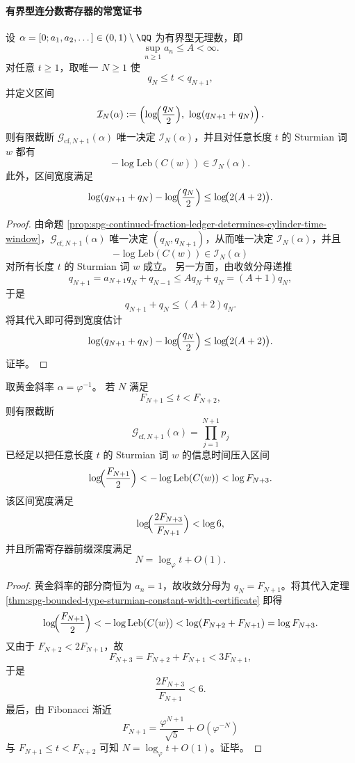 
\paragraph{有界型连分数寄存器的常宽证书}
\begin{theorem}\label{thm:spg-bounded-type-sturmian-constant-width-certificate}
设 \(\alpha=[0;a_1,a_2,\dots]\in(0,1)\setminus\QQ\) 为有界型无理数，即
\[
\sup_{n\ge 1}a_n\le A<\infty.
\]
对任意 \(t\ge 1\)，取唯一 \(N\ge 1\) 使
\[
q_N\le t<q_{N+1},
\]
并定义区间
\[
\mathcal I_N(\alpha)
:=
\left(
\log\!\Bigl(\frac{q_N}{2}\Bigr),\ 
\log(q_{N+1}+q_N)
\right).
\]
则有限截断 \(\mathcal G_{\mathrm{cf},N+1}(\alpha)\) 唯一决定 \(\mathcal I_N(\alpha)\)，并且对任意长度 \(t\) 的 Sturmian 词 \(w\) 都有
\[
-\log \mathrm{Leb}(C(w))\in \mathcal I_N(\alpha).
\]
此外，区间宽度满足
\[
\log(q_{N+1}+q_N)-\log\!\Bigl(\frac{q_N}{2}\Bigr)
\le
\log\!\bigl(2(A+2)\bigr).
\]
\end{theorem}
\begin{proof}
由命题 \ref{prop:spg-continued-fraction-ledger-determines-cylinder-time-window}，\(\mathcal G_{\mathrm{cf},N+1}(\alpha)\) 唯一决定 \((q_N,q_{N+1})\)，从而唯一决定 \(\mathcal I_N(\alpha)\)，并且
\[
-\log \mathrm{Leb}(C(w))\in \mathcal I_N(\alpha)
\]
对所有长度 \(t\) 的 Sturmian 词 \(w\) 成立。
另一方面，由收敛分母递推
\[
q_{N+1}=a_{N+1}q_N+q_{N-1}\le Aq_N+q_N=(A+1)q_N,
\]
于是
\[
q_{N+1}+q_N\le (A+2)q_N.
\]
将其代入即可得到宽度估计
\[
\log(q_{N+1}+q_N)-\log\!\Bigl(\frac{q_N}{2}\Bigr)
\le
\log\!\bigl(2(A+2)\bigr).
\]
证毕。
\end{proof}

\begin{corollary}[黄金斜率下的对数深度算术认证]\label{cor:spg-golden-sturmian-logarithmic-arithmetic-certificate}
取黄金斜率 \(\alpha=\varphi^{-1}\)。
若 \(N\) 满足
\[
F_{N+1}\le t<F_{N+2},
\]
则有限截断
\[
\mathcal G_{\mathrm{cf},N+1}(\alpha)=\prod_{j=1}^{N+1}p_j
\]
已经足以把任意长度 \(t\) 的 Sturmian 词 \(w\) 的信息时间压入区间
\[
\log\!\Bigl(\frac{F_{N+1}}{2}\Bigr)
<
-\log \mathrm{Leb}(C(w))
<
\log F_{N+3}.
\]
该区间宽度满足
\[
\log\!\Bigl(\frac{2F_{N+3}}{F_{N+1}}\Bigr)<\log 6,
\]
并且所需寄存器前缀深度满足
\[
N=\log_\varphi t+O(1).
\]
\end{corollary}
\begin{proof}
黄金斜率的部分商恒为 \(a_n=1\)，故收敛分母为 \(q_N=F_{N+1}\)。将其代入定理 \ref{thm:spg-bounded-type-sturmian-constant-width-certificate} 即得
\[
\log\!\Bigl(\frac{F_{N+1}}{2}\Bigr)
<
-\log \mathrm{Leb}(C(w))
<
\log(F_{N+2}+F_{N+1})
=
\log F_{N+3}.
\]
又由于 \(F_{N+2}<2F_{N+1}\)，故
\[
F_{N+3}=F_{N+2}+F_{N+1}<3F_{N+1},
\]
于是
\[
\frac{2F_{N+3}}{F_{N+1}}<6.
\]
最后，由 Fibonacci 渐近
\[
F_{N+1}=\frac{\varphi^{N+1}}{\sqrt5}+O(\varphi^{-N})
\]
与 \(F_{N+1}\le t<F_{N+2}\) 可知 \(N=\log_\varphi t+O(1)\)。证毕。
\end{proof}

